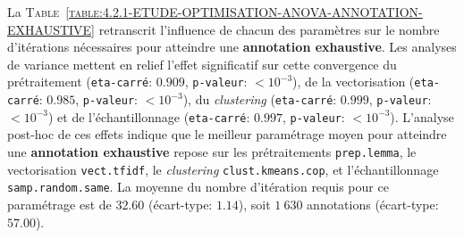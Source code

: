 			La \textsc{Table~\ref{table:4.2.1-ETUDE-OPTIMISATION-ANOVA-ANNOTATION-EXHAUSTIVE}} retranscrit l'influence de chacun des paramètres sur le nombre d'itérations nécessaires pour atteindre une \textbf{annotation exhaustive}.
			Les analyses de variance mettent en relief l'effet significatif sur cette convergence du prétraitement (\texttt{eta-carré}: $0.909$, \texttt{p-valeur}: $< 10^{-3}$), de la vectorisation (\texttt{eta-carré}: $0.985$, \texttt{p-valeur}: $< 10^{-3}$), du \textit{clustering} (\texttt{eta-carré}: $0.999$, \texttt{p-valeur}: $< 10^{-3}$) et de l'échantillonnage (\texttt{eta-carré}: $0.997$, \texttt{p-valeur}: $< 10^{-3}$).
			L'analyse post-hoc de ces effets indique que le meilleur paramétrage moyen pour atteindre une \textbf{annotation exhaustive} repose sur les prétraitements \texttt{prep.lemma}, le vectorisation \texttt{vect.tfidf}, le \textit{clustering} \texttt{clust.kmeans.cop}, et l'échantillonnage \texttt{samp.random.same}. La moyenne du nombre d'itération requis pour ce paramétrage est de $32.60$ (écart-type: $1.14$), soit $1~630$ annotations (écart-type: $57.00$).
